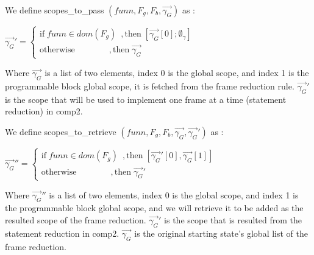 \documentclass[UTF8]{article}
\begin{document}
\begin{figure}[ht!]
    \ottusedrule{\ottdruleframesXXcompOne{}} \\
    \ottusedrule{\ottdruleframesXXcompTwo{}}
\end{figure}


We define scopes\_to\_pass $ ( funn, F_g , F_b , \overrightarrow{\gamma_G}) $ as : \vspace{10pt}

 $  \overrightarrow{\gamma_G}' =\begin{cases}
            \mathrm{if} \; funn \in dom(F_g)    \hspace{6pt} ,
            \mathrm{then} \; [\overrightarrow{\gamma_G}[0] ; \emptyset_{\gamma}] \\
            \mathrm{otherwise}    \hspace{48pt}     , 
            \mathrm{then} \; \overrightarrow{\gamma_G} 
        \end{cases}$     \vspace{10pt}

Where $\overrightarrow{\gamma_G}$ is a list of two elements, index 0 is the global scope, and index 1 is the programmable block global scope, it is fetched from the frame reduction rule. $\overrightarrow{\gamma_G}'$ is the scope that will be used to implement one frame at a time (statement reduction) in comp2.

We define scopes\_to\_retrieve $( funn, F_g , F_b , \overrightarrow{\gamma_G}, \overrightarrow{\gamma_G}')$ as : \vspace{10pt}

 $  \overrightarrow{\gamma_G}'' =\begin{cases}
            \mathrm{if} \; funn \in dom(F_g)    \hspace{6pt} ,
            \mathrm{then} \; [\overrightarrow{\gamma_G}'[0],\overrightarrow{\gamma_G}[1]]  \\
            \mathrm{otherwise}    \hspace{48pt}     , 
            \mathrm{then} \; \overrightarrow{\gamma_G}' 
        \end{cases}$   \vspace{10pt}

Where $\overrightarrow{\gamma_G}''$ is a list of two elements, index 0 is the global scope, and index 1 is the programmable block global scope, and we will retrieve it to be added as the resulted scope of the frame reduction.
$\overrightarrow{\gamma_G}'$ is the scope that is resulted from the statement reduction in comp2. 
$\overrightarrow{\gamma_G}$ is the original starting state's global list of the frame reduction. 
\end{document}
